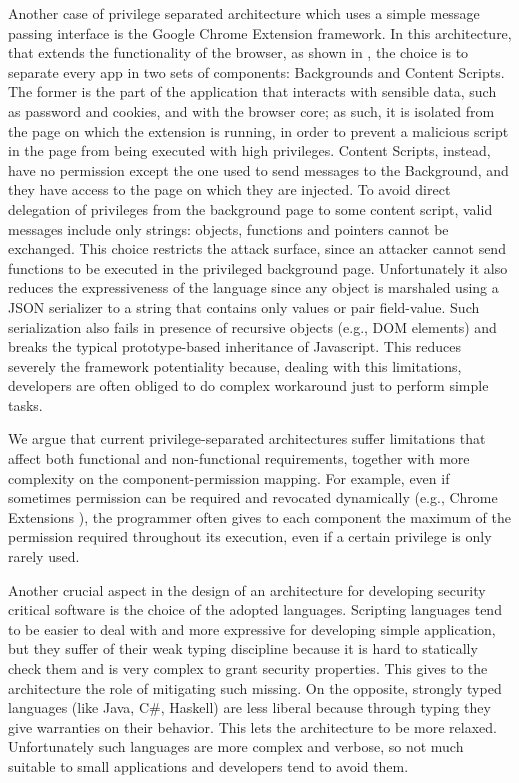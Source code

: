 \documentclass[10pt,a4paper,draft]{article}
\begin{document}
Another case of privilege separated architecture which uses a simple message passing interface is the Google Chrome Extension framework. In this architecture, that extends the functionality of the browser, as shown in \cite{ChromeExtSpec,ChromeExtSpecSnd}, the choice is to separate every app in two sets of components: Backgrounds and Content Scripts. The former is the part of the application that interacts with sensible data, such as password and cookies, and with the browser core; as such, it is isolated from the page on which the extension is running, in order to prevent a malicious script in the page from being executed with high privileges. Content Scripts, instead, have no permission except the one used to send messages to the Background, and they have access to the page on which they are injected. To avoid direct delegation of privileges from the background page to some content script, valid messages include only strings: objects, functions and pointers cannot be exchanged. This choice restricts the attack surface, since an attacker cannot send functions to be executed in the privileged background page. Unfortunately it also reduces the expressiveness of the language since any object is marshaled using a JSON serializer to a string that contains only values or pair field-value. Such serialization also fails in presence of recursive objects (e.g., DOM elements) and breaks the typical prototype-based inheritance of Javascript. This reduces severely the  framework potentiality because, dealing with this limitations, developers are often obliged to do complex workaround just to perform simple tasks.

We argue that current privilege-separated architectures suffer limitations that affect both functional and non-functional requirements, together with more complexity on the component-permission mapping. For example, even if sometimes permission can be required and revocated dynamically (e.g., Chrome Extensions \cite{ChromeExtensionOnline}), the programmer often gives to each component the maximum of the permission required throughout its execution, even if a certain privilege is only rarely used.

Another crucial aspect in the design of an architecture for developing security critical software is the choice of the adopted languages. Scripting languages tend to be easier to deal with and more expressive for developing simple application, but they suffer of their weak typing discipline because it is hard to statically check them and is very complex to grant security properties. This gives to the architecture the role of mitigating such missing. On the opposite, strongly typed languages (like Java, C\#, Haskell) are less liberal because through typing they give warranties on their behavior. This lets the architecture to be more relaxed. Unfortunately such languages are more complex and verbose, so not much suitable to small applications and developers tend to avoid them.
\end{document}
